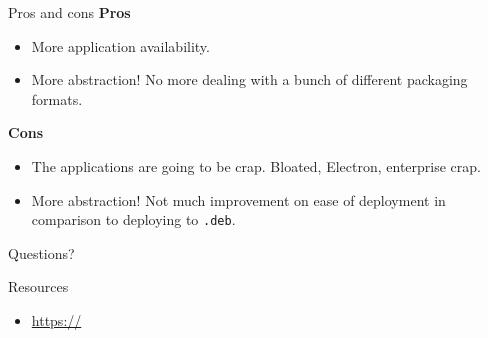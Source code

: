 \documentclass{lug}
\begin{document}
\begin{frame}{Pros and cons}
    \textbf{Pros}
    \begin{itemize}
        \item More application availability.
        \item More abstraction! No more dealing with a bunch of different
            packaging formats.
    \end{itemize}

    \textbf{Cons}
    \begin{itemize}
        \item The applications are going to be crap. Bloated, Electron,
            enterprise crap.
        \item More abstraction! Not much improvement on ease of deployment in
            comparison to deploying to \texttt{.deb}.
    \end{itemize}
\end{frame}


\begin{frame}[standout]
    \Huge
    Questions?
\end{frame}

\begin{frame}{Resources}
    \begin{itemize}
        \item \url{https://}
    \end{itemize}
\end{frame}
\end{document}

